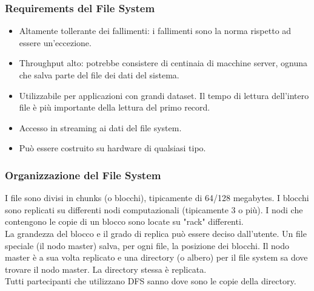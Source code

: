 \documentclass{article}
\begin{document}
\begin{appendices}
\subsubsection{Requirements del File System}
\begin{itemize}
    \item Altamente tollerante dei fallimenti: i fallimenti sono la norma rispetto ad essere un'eccezione.
    \item Throughput alto: potrebbe consistere di centinaia di macchine server, ognuna che salva parte del file dei dati del sistema.
    \item Utilizzabile per applicazioni con grandi dataset. Il tempo di lettura dell'intero file è più importante della lettura del primo record.
    \item Accesso in streaming ai dati del file system.
    \item Può essere costruito su hardware di qualsiasi tipo.
\end{itemize}

\subsubsection{Organizzazione del File System}
I file sono divisi in chunks (o blocchi), tipicamente di 64/128 megabytes. I blocchi sono replicati su differenti nodi computazionali (tipicamente 3 o più). I nodi che contengono le copie di un blocco sono locate su "rack" differenti. \\
La grandezza del blocco e il grado di replica può essere deciso dall'utente. Un file speciale (il nodo master) salva, per ogni file, la posizione dei blocchi. Il nodo master è a sua volta replicato e una directory (o albero) per il file system sa dove trovare il nodo master. La directory stessa è replicata. \\
Tutti partecipanti che utilizzano DFS sanno dove sono le copie della directory. 


\end{appendices}
\end{document}

